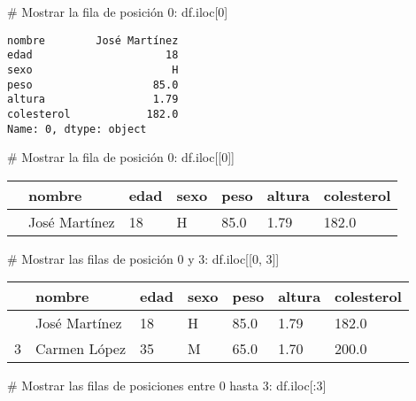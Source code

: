 \documentclass[
  letterpaper,
  DIV=11,
  numbers=noendperiod]{scrreprt}
\newenvironment{Shaded}{\begin{snugshade}}{\end{snugshade}}
\newcommand{\CommentTok}[1]{\textcolor[rgb]{0.37,0.37,0.37}{#1}}
\newcommand{\DecValTok}[1]{\textcolor[rgb]{0.68,0.00,0.00}{#1}}
\newcommand{\NormalTok}[1]{\textcolor[rgb]{0.00,0.23,0.31}{#1}}
\begin{document}
\begin{Shaded}
\begin{Highlighting}[]
\CommentTok{\# Mostrar la fila de posición 0:}
\NormalTok{df.iloc[}\DecValTok{0}\NormalTok{]}
\end{Highlighting}
\end{Shaded}

\begin{verbatim}
nombre        José Martínez
edad                     18
sexo                      H
peso                   85.0
altura                 1.79
colesterol            182.0
Name: 0, dtype: object
\end{verbatim}

\begin{Shaded}
\begin{Highlighting}[]
\CommentTok{\# Mostrar la fila de posición 0:}
\NormalTok{df.iloc[[}\DecValTok{0}\NormalTok{]]}
\end{Highlighting}
\end{Shaded}

\begin{longtable}[]{@{}lllllll@{}}
\toprule\noalign{}
& nombre & edad & sexo & peso & altura & colesterol \\
\midrule\noalign{}
\endhead
\bottomrule\noalign{}
\endlastfoot
0 & José Martínez & 18 & H & 85.0 & 1.79 & 182.0 \\
\end{longtable}

\begin{Shaded}
\begin{Highlighting}[]
\CommentTok{\# Mostrar las filas de posición 0 y 3:}
\NormalTok{df.iloc[[}\DecValTok{0}\NormalTok{, }\DecValTok{3}\NormalTok{]]}
\end{Highlighting}
\end{Shaded}

\begin{longtable}[]{@{}lllllll@{}}
\toprule\noalign{}
& nombre & edad & sexo & peso & altura & colesterol \\
\midrule\noalign{}
\endhead
\bottomrule\noalign{}
\endlastfoot
0 & José Martínez & 18 & H & 85.0 & 1.79 & 182.0 \\
3 & Carmen López & 35 & M & 65.0 & 1.70 & 200.0 \\
\end{longtable}

\begin{Shaded}
\begin{Highlighting}[]
\CommentTok{\# Mostrar las filas de posiciones entre 0 hasta 3:}
\NormalTok{df.iloc[:}\DecValTok{3}\NormalTok{]}
\end{Highlighting}
\end{Shaded}
\end{document}
